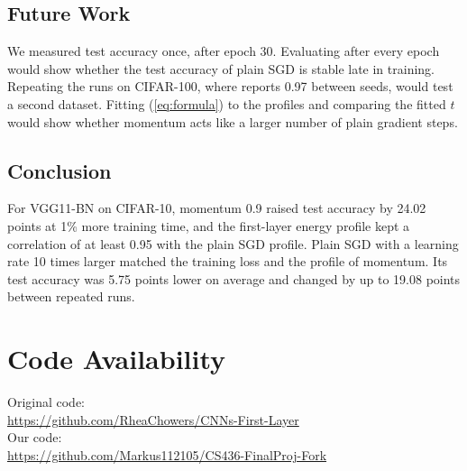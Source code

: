 \documentclass[conference]{IEEEtran}
\begin{document}
\subsection{Future Work}
We measured test accuracy once, after epoch 30. Evaluating after every epoch
would show whether the test accuracy of plain SGD is stable late in training.
Repeating the runs on CIFAR-100, where \cite{chowers2023} reports 0.97 between
seeds, would test a second dataset. Fitting (\ref{eq:formula}) to the profiles
and comparing the fitted $t$ would show whether momentum acts like a larger
number of plain gradient steps.

\subsection{Conclusion}
For VGG11-BN on CIFAR-10, momentum 0.9 raised test accuracy by 24.02 points
at 1\% more training time, and the first-layer energy profile kept a
correlation of at least 0.95 with the plain SGD profile. Plain SGD with a
learning rate 10 times larger matched the training loss and the profile of
momentum. Its test accuracy was 5.75 points lower on average and changed by up
to 19.08 points between repeated runs.

\section*{Code Availability}
\noindent Original code:\\
\url{https://github.com/RheaChowers/CNNs-First-Layer}\\
Our code:\\
\url{https://github.com/Markus112105/CS436-FinalProj-Fork}
\end{document}
